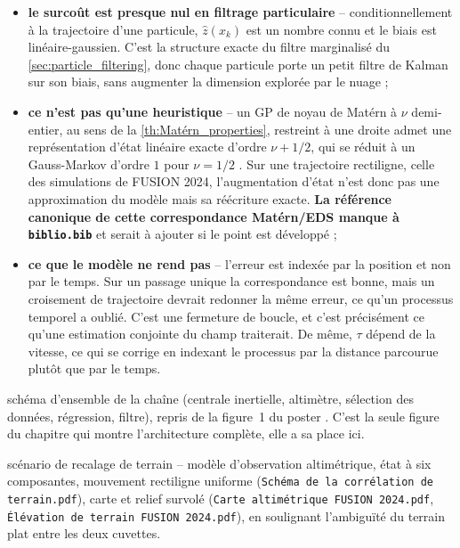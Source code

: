 \begin{itemize}
\begin{itemize}
		\item \textbf{le surcoût est presque nul en filtrage particulaire} -- conditionnellement à la trajectoire d'une particule, $\hat{z}(x_k)$ est un nombre connu et le biais est linéaire-gaussien. C'est la structure exacte du filtre marginalisé du \cref{sec:particle_filtering}, donc chaque particule porte un petit filtre de Kalman sur son biais, sans augmenter la dimension explorée par le nuage ;
		\item \textbf{ce n'est pas qu'une heuristique} -- un GP de noyau de Matérn à $\nu$ demi-entier, au sens de la \cref{th:Matérn_properties}, restreint à une droite admet une représentation d'état linéaire exacte d'ordre $\nu+1/2$, qui se réduit à un Gauss-Markov d'ordre $1$ pour $\nu=1/2$ \cite{bib:Solin-master}. Sur une trajectoire rectiligne, celle des simulations de FUSION 2024, l'augmentation d'état n'est donc pas une approximation du modèle mais sa réécriture exacte. \textbf{La référence canonique de cette correspondance Matérn/EDS manque à \texttt{biblio.bib}} et serait à ajouter si le point est développé ;
		\item \textbf{ce que le modèle ne rend pas} -- l'erreur est indexée par la position et non par le temps. Sur un passage unique la correspondance est bonne, mais un croisement de trajectoire devrait redonner la même erreur, ce qu'un processus temporel a oublié. C'est une fermeture de boucle, et c'est précisément ce qu'une estimation conjointe du champ traiterait. De même, $\tau$ dépend de la vitesse, ce qui se corrige en indexant le processus par la distance parcourue plutôt que par le temps.
	\end{itemize}
\end{itemize}

{schéma d'ensemble de la chaîne (centrale inertielle, altimètre, sélection des données, régression, filtre), repris de la figure~1 du poster \cite{bib:data-selection}. C'est la seule figure du chapitre qui montre l'architecture complète, elle a sa place ici.}

{scénario de recalage de terrain -- modèle d'observation altimétrique, état à six composantes, mouvement rectiligne uniforme (\texttt{Schéma de la corrélation de terrain.pdf}), carte et relief survolé (\texttt{Carte altimétrique FUSION 2024.pdf}, \texttt{Élévation de terrain FUSION 2024.pdf}), en soulignant l'ambiguïté du terrain plat entre les deux cuvettes.}

